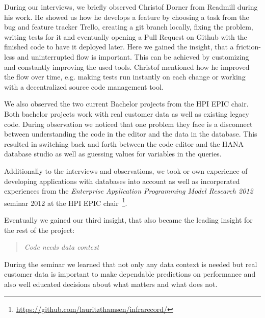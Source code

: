
During our interviews, we briefly observed Christof Dorner from Readmill during his work. He showed us how he develops a feature by choosing a task from the bug and feature tracker Trello, creating a git branch locally, fixing the problem, writing tests for it and eventually opening a Pull Request on Github with the finished code to have it deployed later. Here we gained the insight, that a friction-less and uninterrupted flow is important. This can be achieved by customizing and constantly improving the used tools. Christof mentioned how he improved the flow over time, e.g. making tests run instantly on each change or working with a decentralized source code management tool.

We also observed the two current Bachelor projects from the HPI EPIC chair. Both bachelor projects work with real customer data as well as existing legacy code. During observation we noticed that one problem they face is a disconnect between understanding the code in the editor and the data in the database. This resulted in switching back and forth between the code editor and the HANA database studio as well as guessing values for variables in the queries.

Additionally to the interviews and observations, we took or own experience of developing applications with databases into account as well as incorperated experiences from the \emph{Enterprise Application Programming Model Research 2012} seminar 2012 at the HPI EPIC chair~\footnote{\url{https://github.com/lauritzthamsen/infrarecord/}}.

Eventually we gained our third insight, that also became the leading insight for the rest of the project:

\begin{quote}
\emph{Code needs data context}
\end{quote}

During the seminar we learned that not only any data context is needed but real customer data is important to make dependable predictions on performance and also well educated decisions about what matters and what does not.